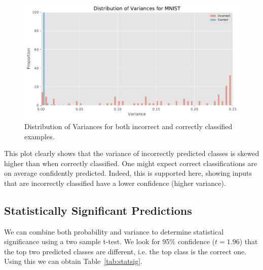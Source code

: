 \documentclass{article}
\begin{document}
\begin{figure}[hbt]
\centering
\includegraphics[width=\hsize]{figures/mnist/variances_combined.pdf}
\caption{Distribution of Variances for both incorrect and correctly classified examples.}
\label{fig:mnist-variances}
\end{figure}


This plot clearly shows that the variance of incorrectly predicted classes is skewed higher than when correctly classified. One might expect correct classifications are on average confidently predicted. Indeed, this is supported here, showing inputs that are incorrectly classified have a lower confidence (higher variance). 


\subsection{Statistically Significant Predictions}
We can combine both probability and variance to determine statistical significance using a two sample t-test. We look for 95\% confidence ($t=1.96$) that the top two predicted classes are different, i.e. the top class is the correct one. Using this we can obtain Table~\ref{tab:statsig}.
\end{document}
